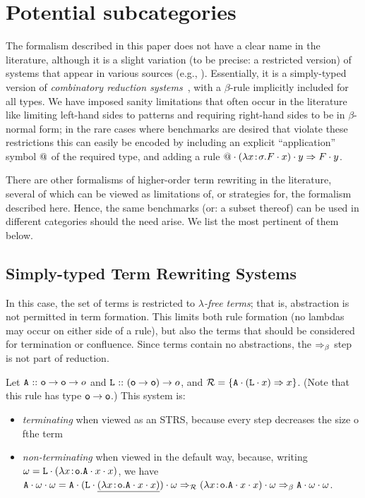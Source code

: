 \section{Potential subcategories}

The formalism described in this paper does not have a clear name in the literature, although it is
a slight variation (to be precise: a restricted version) of systems that appear in various sources
(e.g., \cite{bla:00,kop:12}).
Essentially, it is a simply-typed version of \emph{combinatory reduction systems}~\cite{klo:80},
with a $\beta$-rule implicitly included for all types.
We have imposed sanity limitations that often occur in the literature like limiting left-hand sides
to patterns and requiring right-hand sides to be in $\beta$-normal form; in the rare cases where
benchmarks are desired that violate these restrictions this can easily be encoded by including an
explicit ``application'' symbol $\mathtt{@}$ of the required type, and adding a rule
$\mathtt{@} \cdot (\lambda x\!:\!\sigma.F \cdot x) \cdot y \Rightarrow F \cdot y$.

There are other formalisms of higher-order term rewriting in the literature, several of which can be
viewed as limitations of, or strategies for, the formalism described here.  Hence, the same
benchmarks (or: a subset thereof) can be used in different categories should the need arise.  We
list the most pertinent of them below.

\subsection{Simply-typed Term Rewriting Systems~\cite{kus:01}}

In this case, the set of terms is restricted to \emph{$\lambda$-free terms}; that is, abstraction
is not permitted in term formation.  This limits both rule formation (no lambdas may occur on
either side of a rule), but also the terms that should be considered for termination or confluence.
Since terms contain no abstractions, the $\Rightarrow_{\beta}$ step is not part of reduction.

\begin{example}
Let $\mathtt{A} \ \mathtt{::}\  \mathsf{o} \rightarrow \mathsf{o} \rightarrow{o}$ and
$\mathtt{L} \ \mathtt{::}\  (\mathsf{o} \rightarrow \mathsf{o}) \rightarrow{o}$, and
$\mathcal{R} = \{ \mathtt{A} \cdot (\mathtt{L} \cdot x) \Rightarrow x \}$.
(Note that this rule has type $\mathsf{o} \rightarrow \mathsf{o}$.)
This system is:
\begin{itemize}
\item \emph{terminating} when viewed as an STRS, because every step decreases the size o fthe term
\item \emph{non-terminating} when viewed in the default way, because, writing
  $\omega = \mathtt{L} \cdot (\lambda x\!:\!\mathtt{o}.\mathtt{A} \cdot x \cdot x)$,
  we have $
  \mathtt{A} \cdot \omega \cdot \omega =
  \mathtt{A} \cdot (\mathtt{L} \cdot \underline{(\lambda x\!:\!\mathtt{o}.\mathtt{A} \cdot x \cdot x)}) \cdot \omega \Rightarrow_{\mathcal{R}}
  (\lambda x\!:\!\mathtt{o}.\mathtt{A} \cdot x \cdot x) \cdot \omega \Rightarrow_{\beta}
  \mathtt{A} \cdot \omega \cdot \omega$.
\end{itemize}
\end{example}

